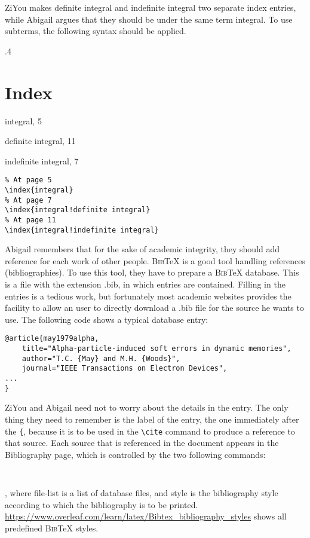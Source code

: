 ZiYou makes definite integral and indefinite integral two separate index entries, while Abigail argues that they should be under the same term integral. To use subterms, the following syntax should be applied.
\begin{miniexammar}{.4\textandmarginlen}{
\section*{Index}
integral, 5
\par \hspace{2em} definite integral, 11
\par \hspace{2em} indefinite integral, 7
}
\begin{lstlisting}
% At page 5
\index{integral}
% At page 7
\index{integral!definite integral}
% At page 11
\index{integral!indefinite integral}
\end{lstlisting}
\end{miniexammar}

Abigail remembers that for the sake of academic integrity, they should add reference for each work of other people. B\textsc{ib}\TeX{} is a good tool handling references (bibliographies). To use this tool, they have to prepare a B\textsc{ib}\TeX{} database. This is a file with the extension .bib, in which entries are contained. Filling in the entries is a tedious work, but fortunately most academic websites provides the facility to allow an user to directly download a .bib file for the source he wants to use. The following code shows a typical database entry:
\begin{lstlisting}
@article{may1979alpha,
	title="Alpha-particle-induced soft errors in dynamic memories",
	author="T.C. {May} and M.H. {Woods}",
	journal="IEEE Transactions on Electron Devices",
...
}
\end{lstlisting}
ZiYou and Abigail need not to worry about the details in the entry. The only thing they need to remember is the label of the entry, the one immediately after the \verb={=, because it is to be used in the \verb=\cite= command to produce a reference to that source. Each source that is referenced in the document appears in the Bibliography page, which is controlled by the two following commands:
\begin{lstlisting}


\end{lstlisting}
, where file-list is a list of database files, and style is the bibliography style according to which the bibliography is to be printed. \url{https://www.overleaf.com/learn/latex/Bibtex_bibliography_styles} shows all predefined B\textsc{ib}\TeX{} styles.

